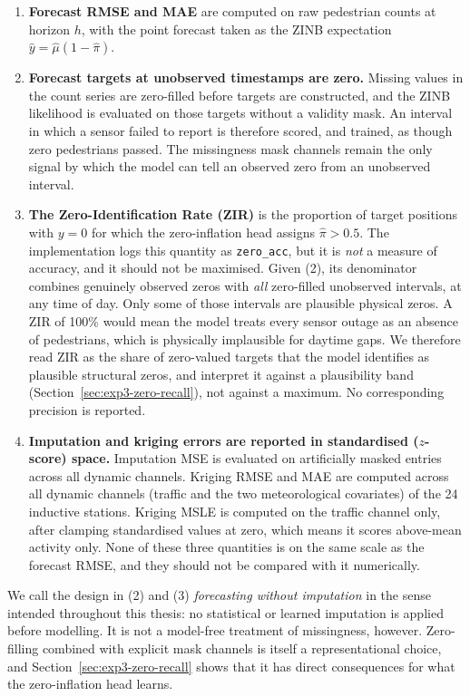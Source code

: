 \begin{enumerate}
    \item \textbf{Forecast RMSE and MAE} are computed on raw pedestrian
    counts at horizon $h$, with the point forecast taken as the ZINB
    expectation $\hat{y} = \hat{\mu}(1 - \hat{\pi})$.
    \item \textbf{Forecast targets at unobserved timestamps are zero.}
    Missing values in the count series are zero-filled before targets
    are constructed, and the ZINB likelihood is evaluated on those
    targets without a validity mask. An interval in which a sensor
    failed to report is therefore scored, and trained, as though zero
    pedestrians passed. The missingness mask channels remain the only
    signal by which the model can tell an observed zero from an
    unobserved interval.
    \item \textbf{The Zero-Identification Rate (ZIR)} is the proportion
    of target positions with $y = 0$ for which the zero-inflation head
    assigns $\hat{\pi} > 0.5$. The implementation logs this quantity as
    \texttt{zero\_acc}, but it is \emph{not} a measure of accuracy, and
    it should not be maximised. Given (2), its denominator combines
    genuinely observed zeros with \emph{all} zero-filled unobserved
    intervals, at any time of day. Only some of those intervals are
    plausible physical zeros. A ZIR of 100\% would mean the model
    treats every sensor outage as an absence of pedestrians, which is
    physically implausible for daytime gaps. We therefore read ZIR as
    the share of zero-valued targets that the model identifies as
    plausible structural zeros, and interpret it against a plausibility
    band (Section~\ref{sec:exp3-zero-recall}), not against a
    maximum. No corresponding precision is reported.
    \item \textbf{Imputation and kriging errors are reported in
    standardised ($z$-score) space.} Imputation MSE is evaluated on
    artificially masked entries across all dynamic channels. Kriging
    RMSE and MAE are computed across all dynamic channels (traffic and
    the two meteorological covariates) of the 24 inductive stations.
    Kriging MSLE is computed on the traffic channel only, after clamping
    standardised values at zero, which means it scores
    above-mean activity only. None of these three quantities is on the
    same scale as the forecast RMSE, and they should not be compared
    with it numerically.
\end{enumerate}

We call the design in (2) and (3) \emph{forecasting without imputation}
in the sense intended throughout this thesis: no statistical or learned
imputation is applied before modelling. It is not a model-free treatment
of missingness, however. Zero-filling combined with explicit mask
channels is itself a representational choice, and
Section~\ref{sec:exp3-zero-recall} shows that it has direct consequences
for what the zero-inflation head learns.

